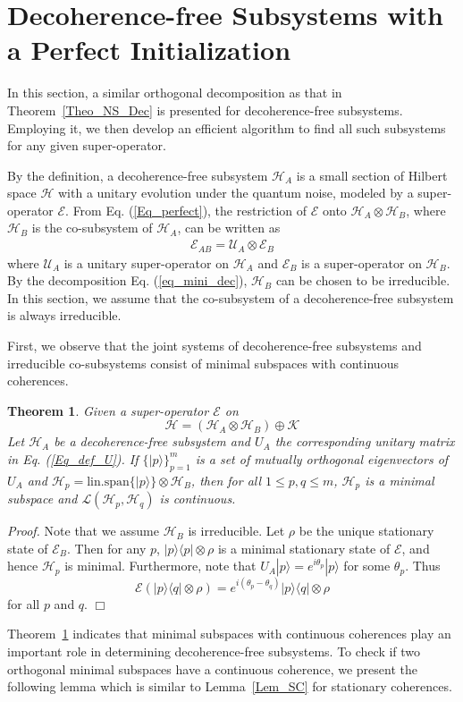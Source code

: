 \documentclass[journal]{IEEEtran}
\def\h{\ensuremath{\mathcal{H}}}
\def\l{\ensuremath{\mathcal{L}}}
\def\u{\ensuremath{\mathcal{U}}}
\def\k{\ensuremath{\mathcal{K}}}
\def\u{\ensuremath{\mathcal{U}}}
\def\e{\ensuremath{\mathcal{E}}}
\def\l{\ensuremath{\mathcal{L}}}
\def\l{\mathcal{L}}
\def\k{\mathcal{K}}
\newtheorem{theorem}{Theorem}
\begin{document}
\section{Decoherence-free Subsystems with a Perfect Initialization}
In this section, a similar orthogonal decomposition as that in Theorem~\ref{Theo_NS_Dec} is presented for decoherence-free subsystems. Employing it, we then develop an efficient algorithm to find all such subsystems for any given super-operator. 

By the definition, a decoherence-free subsystem $\h_A$  is a small section of Hilbert space $\h$ with a unitary evolution under the quantum noise, modeled by a super-operator $\e$. From Eq. (\ref{Eq_perfect}), the restriction of $\e$ onto $\h_A\otimes\h_B $, where $\h_B$ is the co-subsystem of $\h_A$, can be written as \begin{eqnarray}\label{eq_dfs_form}
  \e_{AB}=\u_A\otimes \e_{B}
\end{eqnarray} where $\u_A$ is a unitary super-operator on $\h_A$ and $\e_B$ is a super-operator on $\h_{B}.$  By the decomposition Eq. (\ref{eq_mini_dec}), $\h_B$ can be chosen to be  irreducible. In this section, we assume that the co-subsystem of a decoherence-free subsystem is always irreducible. 

First, we observe that  the joint systems of decoherence-free subsystems and irreducible co-subsystems consist of minimal subspaces with continuous coherences. 
\begin{theorem}\label{Theo_dfs_cc}
    Given a super-operator $\e$ on 
    $$\h=(\h_A\otimes\h_B)\oplus \k$$ Let $\h_A$ be a decoherence-free subsystem and $U_A$ the corresponding unitary matrix in Eq. (\ref{Eq_def_U}). If  $\{|p\rangle\}_{p=1}^{m}$ is a set of mutually orthogonal eigenvectors of $U_A$ and $\h_p=\textrm{lin.span}\{|p\rangle\}\otimes \h_B$, then for all $1\leq p,q\leq m$,  $\h_p$  is a minimal subspace and
    $\l(\h_p,\h_q)$ is continuous.
  \end{theorem}  

{\it Proof.} Note that we assume $\h_B$ is irreducible. Let $\rho$ be the unique stationary state of $\e_B$.  Then for any $p$, $|p\rangle\langle p|\otimes \rho$ is a minimal stationary state of $\e$, and hence $\h_p$ is minimal. Furthermore, note that $U_A|p\rangle=e^{i\theta_p}|p\rangle$ for some $\theta_p$. Thus $$\e(|p\rangle\langle q|\otimes \rho)=e^{i(\theta_p-\theta_q)}|p\rangle\langle q|\otimes \rho$$ for all $p$ and $q.$
\hfill $\Box$

Theorem~\ref{Theo_dfs_cc} indicates that minimal subspaces with continuous coherences play an important role in determining decoherence-free subsystems. To check if two orthogonal minimal subspaces have a continuous coherence, we present the following lemma which is similar to Lemma~\ref{Lem_SC} for stationary coherences.
\end{document}
